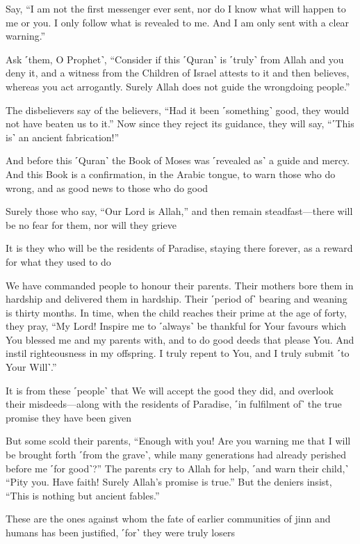 Say, “I am not the first messenger ever sent, nor do I know what will happen to me or you. I only follow what is revealed to me. And I am only sent with a clear warning.”

Ask ˹them, O Prophet˺, “Consider if this ˹Quran˺ is ˹truly˺ from Allah and you deny it, and a witness from the Children of Israel attests to it and then believes, whereas you act arrogantly. Surely Allah does not guide the wrongdoing people.”

The disbelievers say of the believers, “Had it been ˹something˺ good, they would not have beaten us to it.” Now since they reject its guidance, they will say, “˹This is˺ an ancient fabrication!”

And before this ˹Quran˺ the Book of Moses was ˹revealed as˺ a guide and mercy. And this Book is a confirmation, in the Arabic tongue, to warn those who do wrong, and as good news to those who do good

Surely those who say, “Our Lord is Allah,” and then remain steadfast—there will be no fear for them, nor will they grieve

It is they who will be the residents of Paradise, staying there forever, as a reward for what they used to do

We have commanded people to honour their parents. Their mothers bore them in hardship and delivered them in hardship. Their ˹period of˺ bearing and weaning is thirty months. In time, when the child reaches their prime at the age of forty, they pray, “My Lord! Inspire me to ˹always˺ be thankful for Your favours which You blessed me and my parents with, and to do good deeds that please You. And instil righteousness in my offspring. I truly repent to You, and I truly submit ˹to Your Will˺.”

It is from these ˹people˺ that We will accept the good they did, and overlook their misdeeds—along with the residents of Paradise, ˹in fulfilment of˺ the true promise they have been given

But some scold their parents, “Enough with you! Are you warning me that I will be brought forth ˹from the grave˺, while many generations had already perished before me ˹for good˺?” The parents cry to Allah for help, ˹and warn their child,˺ “Pity you. Have faith! Surely Allah’s promise is true.” But the deniers insist, “This is nothing but ancient fables.”

These are the ones against whom the fate of earlier communities of jinn and humans has been justified, ˹for˺ they were truly losers

